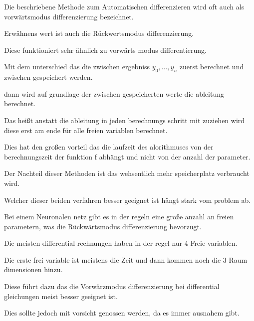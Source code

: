 Die beschriebene Methode zum Automatischen differenzieren wird oft auch als vorwärtsmodus differenzierung bezeichnet.

Erwähnens wert ist auch die Rückwertsmodus differenzierung.

Diese funktioniert sehr ähnlich zu vorwärts modus differentierung.

Mit dem unterschied das die zwischen ergebniss $y_0, ... , y_n$ zuerst berechnet und zwischen gespeichert werden.

dann wird auf grundlage der zwischen gespeicherten werte die ableitung berechnet.

Das heißt anstatt die ableitung in jeden berechnungs schritt mit zuziehen wird diese erst am ende für alle freien variablen berechnet.

Dies hat den großen vorteil das die laufzeit des alorithmuses von der berechnungszeit der funktion f abhängt und nicht von der anzahl der parameter.

Der Nachteil dieser Methoden ist das wehsentlich mehr speicherplatz verbraucht wird.


Welcher dieser beiden verfahren besser geeignet ist hängt stark vom problem ab.

Bei einem Neuronalen netz gibt es in der regeln eine große anzahl an freien parametern, was die Rückwärtsmodus differenzierung bevorzugt.

Die meisten differential rechnungen haben in der regel nur 4 Freie variablen.

Die erste frei variable ist meistens die Zeit und dann kommen noch die 3 Raum dimensionen hinzu.

Diese führt dazu das die Vorwärzmodus differenzierung bei differential gleichungen meist besser geeignet ist.

Dies sollte jedoch mit vorsicht genossen werden, da es immer ausnahem gibt.






